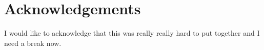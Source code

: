 \chapter{Acknowledgements}

I would like to acknowledge that this was really really hard to put together and I need a break now.
